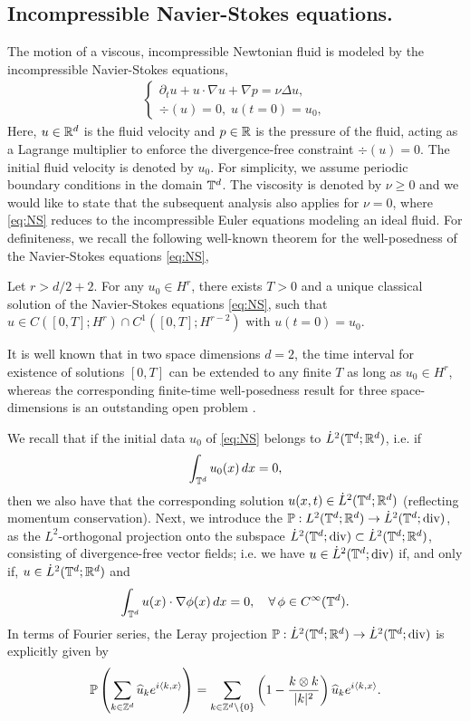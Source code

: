 \documentclass[reqno,a4paper]{amsart}
\begin{document}
\subsection{Incompressible Navier-Stokes equations.}
\label{sec:NS}
The motion of a viscous, incompressible Newtonian fluid is modeled by the incompressible Navier-Stokes equations,
\begin{align} \label{eq:NS}
\left\{
\begin{aligned}
\partial_t u + u\cdot \nabla u + \nabla p = \nu \Delta u, \\
\div(u) = 0, \; u(t=0) = u_0,
\end{aligned}
\right.
\end{align}
Here, $u \in \mathbb{R}^d$ is the fluid velocity and $p\in \mathbb{R}$ is the pressure of the fluid, acting as a Lagrange multiplier to enforce the divergence-free constraint $\div(u) = 0$. The initial fluid velocity is denoted by $u_0$. For simplicity, we assume periodic boundary conditions in the domain $\mathbb{T}^d$. The viscosity is denoted by $\nu\geq 0$ and we would like to state that the subsequent analysis also applies for $\nu=0$, where \eqref{eq:NS} reduces to the incompressible Euler equations modeling an ideal fluid. For definiteness, we recall the following well-known theorem for the well-posedness of the Navier-Stokes equations \eqref{eq:NS},
\begin{theorem} \label{thm:classicalsol}
Let $r>d/2+2$. For any $u_0 \in H^r$, there exists $T > 0$ and a unique classical solution of the Navier-Stokes equations \eqref{eq:NS}, such that $u \in C([0,T];H^r) \cap C^1([0,T];H^{r-2})$ with $u(t=0) = u_0$.
\end{theorem}
It is well known that in two space dimensions $d=2$, the time interval for existence of solutions $[0,T]$ can be extended to any finite $T$ as long as $u_0 \in H^r$, whereas the corresponding finite-time well-posedness result for three space-dimensions is an outstanding open problem \cite{MB2001}. 

We recall that if the initial data $u_0$ of \eqref{eq:NS} belongs to $\dot{L}^2(\mathbb{T}^d;\mathbb{R}^d)$, i.e. if 
\[
\int_{\mathbb{T}^d} u_0(x) \, dx = 0,
\]
then we also have that the corresponding solution $u(x,t)\in \dot{L}^2(\mathbb{T}^d;\mathbb{R}^d)$ (reflecting momentum conservation). Next, we introduce the  $\mathbb{P}: {L}^2(\mathbb{T}^d;\mathbb{R}^d) \to \dot{L}^2(\mathbb{T}^d;{\mathrm{div}})$, as the $L^2$-orthogonal projection onto the subspace $\dot{L}^2(\mathbb{T}^d;{\mathrm{div}})\subset \dot{L}^2(\mathbb{T}^d;\mathbb{R}^d)$, consisting of divergence-free vector fields; i.e. we have $u\in \dot{L}^2(\mathbb{T}^d;{\mathrm{div}})$ if, and only if, $u\in \dot{L}^2(\mathbb{T}^d;\mathbb{R}^d)$ and 
\[
\int_{\mathbb{T}^d} u(x) \cdot \nabla \phi(x) \, dx = 0, \quad \forall \, \phi \in C^\infty(\mathbb{T}^d). 
\]
In terms of Fourier series, the Leray projection $\mathbb{P}: \dot{L}^2(\mathbb{T}^d;\mathbb{R}^d) \to \dot{L}^2(\mathbb{T}^d;{\mathrm{div}})$ is explicitly given by
\begin{align} \label{eq:leray}
\mathbb{P}\left(
\sum_{k\in \mathbb{Z}^d} \widehat{u}_k e^{i\langle k, x\rangle}
\right)
=
\sum_{k\in \mathbb{Z}^d\setminus \{0\}} \left(
{1} - \frac{k\otimes k}{|k|^2}
\right) \widehat{u}_k e^{i\langle k, x\rangle}.
\end{align}
\end{document}
